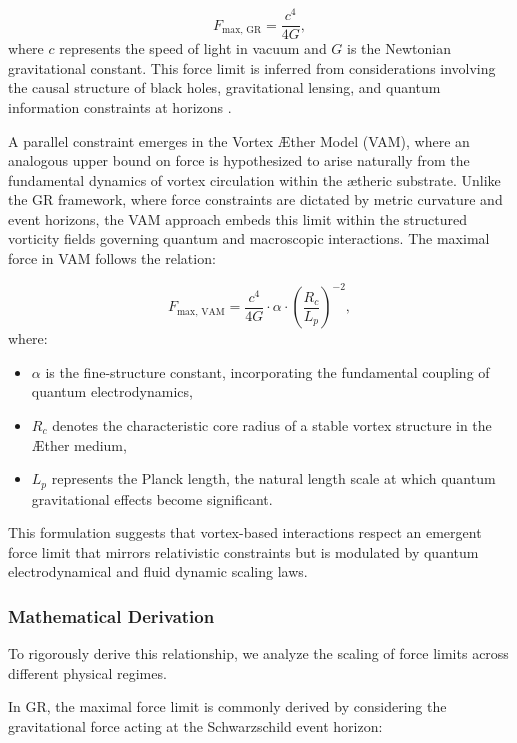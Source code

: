 \documentclass[a4paper,10pt]{article}
\begin{document}
\begin{equation*}
F_\text{max, GR} = \frac{c^4}{4G},
\end{equation*}
where $c$ represents the speed of light in vacuum and $G$ is the Newtonian gravitational constant. This force limit is inferred from considerations involving the causal structure of black holes, gravitational lensing, and quantum information constraints at horizons \cite{Schiller2006}.


A parallel constraint emerges in the Vortex Æther Model (VAM), where an analogous upper bound on force is hypothesized to arise naturally from the fundamental dynamics of vortex circulation within the ætheric substrate. Unlike the GR framework, where force constraints are dictated by metric curvature and event horizons, the VAM approach embeds this limit within the structured vorticity fields governing quantum and macroscopic interactions. The maximal force in VAM follows the relation:


\begin{equation*}
F_\text{max, VAM} = \frac{c^4}{4G} \cdot \alpha \cdot \left(\frac{R_c}{L_p}\right)^{-2},
\end{equation*}
where:
\begin{itemize}
\item $\alpha$ is the fine-structure constant, incorporating the fundamental coupling of quantum electrodynamics,
\item $R_c$ denotes the characteristic core radius of a stable vortex structure in the Æther medium,
\item $L_p$ represents the Planck length, the natural length scale at which quantum gravitational effects become significant.
\end{itemize}


This formulation suggests that vortex-based interactions respect an emergent force limit that mirrors relativistic constraints but is modulated by quantum electrodynamical and fluid dynamic scaling laws.


\subsubsection*{Mathematical Derivation}
To rigorously derive this relationship, we analyze the scaling of force limits across different physical regimes.


In GR, the maximal force limit is commonly derived by considering the gravitational force acting at the Schwarzschild event horizon:
\end{document}
